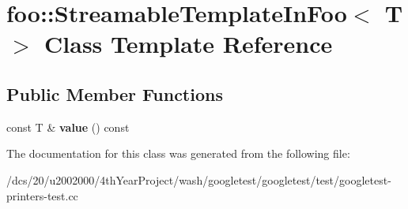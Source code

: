 \hypertarget{classfoo_1_1StreamableTemplateInFoo}{}\section{foo\+:\+:Streamable\+Template\+In\+Foo$<$ T $>$ Class Template Reference}
\label{classfoo_1_1StreamableTemplateInFoo}
\subsection*{Public Member Functions}
\begin{DoxyCompactItemize}
\item 
\mbox{\label{classfoo_1_1StreamableTemplateInFoo_aa6e29a9a298014ce74c65423b6985023}} 
const T \& {\bfseries value} () const
\end{DoxyCompactItemize}


The documentation for this class was generated from the following file\+:\begin{DoxyCompactItemize}
\item 
/dcs/20/u2002000/4th\+Year\+Project/wash/googletest/googletest/test/googletest-\/printers-\/test.\+cc\end{DoxyCompactItemize}
